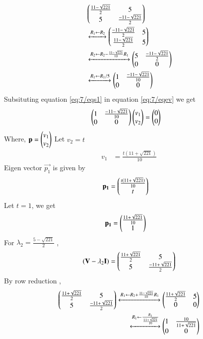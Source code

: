 \documentclass[journal,12pt,twocolumn]{IEEEtran}
\begin{document}
\begin{align}
    &\begin{pmatrix}\frac{11-\sqrt{221}}{2} & 5 \\5 & \frac{-11-\sqrt{221}}{2}\end{pmatrix}\\
    &\xleftrightarrow{R_1\leftarrow R_2}
    \begin{pmatrix}\frac{-11-\sqrt{221}}{2} & 5 \\ \frac{11-\sqrt{221}}{2} & 5\end{pmatrix}\\
 &\xleftrightarrow{R_2\leftarrow R_2-\frac{11-\sqrt{221}}{10}R_{1}}
    \begin{pmatrix}5 & \frac{-11-\sqrt{221}}{2} \\ 0& 0\end{pmatrix}\\
     &\xleftrightarrow{R_1\leftarrow R_1/5}
    \begin{pmatrix}1 & \frac{-11-\sqrt{221}}{10} \\ 0& 0\end{pmatrix}
    \label{eq:7/eqs1}
\end{align}
Subsituting equation \ref{eq:7/eqs1} in equation \ref{eq:7/eqev} we get
\begin{align}
        & \begin{pmatrix}1 & \frac{-11-\sqrt{221}}{10} \\ 0& 0\end{pmatrix}\begin{pmatrix}v_1 \\ v_2\end{pmatrix}=\begin{pmatrix}0 \\ 0\end{pmatrix}\label{eq:7/eqei1}
\end{align}
Where, $\mathbf{p}=\begin{pmatrix}v_1\\v_2\end{pmatrix}$
Let $v_2=t$
\begin{align}
    v_1&=\frac{t(11+\sqrt{221})}{10}
\end{align}
Eigen vector $\vec{p_1}$ is given by
\begin{align}
    \mathbf{p_1}&=\begin{pmatrix}\frac{t(11+\sqrt{221})}{10} \\ t\end{pmatrix}
\end{align}
Let $t=1$, we get
\begin{align}
        \mathbf{p_1}&=\begin{pmatrix}\frac{11+\sqrt{221}}{10} \\1 \end{pmatrix}\label{eq:es71/eqp1}
\end{align}
For $\lambda_2=\frac{5-\sqrt{221}}{2}$ ,
\begin{align}
    (\mathbf{V}-\lambda_2\mathbf{I})=\begin{pmatrix}\frac{11+\sqrt{221}}{2} & 5 \\5 & \frac{-11+\sqrt{221}}{2}\end{pmatrix}
\end{align}
By row reduction , 
\begin{align}
     \begin{pmatrix}\frac{11+\sqrt{221}}{2} & 5 \\5 & \frac{-11+\sqrt{221}}{2}\end{pmatrix}
    \xleftrightarrow{R_1\leftarrow R_2+ \frac{11-\sqrt{221}}{10}R_1}
     \begin{pmatrix}\frac{11+\sqrt{221}}{2} &5\\ 0& 0\end{pmatrix}\\  
 \xleftrightarrow{R_1\leftarrow
 \frac{R_1}{\frac{11+\sqrt{221}}{10}}}
    \begin{pmatrix}1 & \frac{10}{11+\sqrt{221}} \\ 0& 0\end{pmatrix}
    \label{eq:es71/eqs2}
\end{align} 
\end{document}
